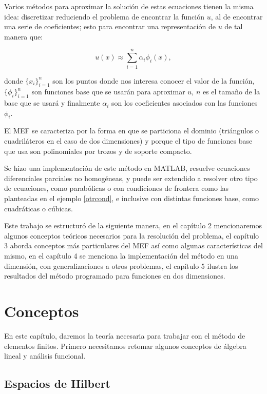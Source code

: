 \documentclass[12pt,spanish,oneside]{book}
\theoremstyle{plain}
\numberwithin{equation}{chapter}
\theoremstyle{definition}
\theoremstyle{remark}
\begin{document}
Varios métodos para aproximar la solución de estas ecuaciones tienen la misma idea: discretizar reduciendo el problema de encontrar la función $u$, al de encontrar una serie de coeficientes; esto para encontrar una representación de $u$ de tal manera que: 

\[u(x) \approx \sum_{i=1}^n\alpha_i \phi_i(x), \]

donde $\lbrace x_i\rbrace_{i=1}^n$ son los puntos donde nos interesa conocer el valor de la función, $\lbrace \phi_i \rbrace_{i=1}^n$ son funciones base que se usarán para aproximar $u$, $n$ es el tamaño de la base que se usará y finalmente $\alpha_i$ son los coeficientes asociados con las funciones $\phi_i$.

El MEF se caracteriza por la forma en que se particiona el dominio (triángulos o cuadriláteros en el caso de dos dimensiones) y porque el tipo de funciones base que usa son polinomiales por trozos y de soporte compacto.

Se hizo una implementación de este método en MATLAB, resuelve ecuaciones diferenciales parciales no homogéneas, y puede ser extendido a resolver otro tipo de ecuaciones, como parabólicas o con condiciones de frontera como las planteadas en el ejemplo \ref{otrcond}, e inclusive con distintas funciones base, como cuadráticas o cúbicas.

Este trabajo se estructuró de la siguiente manera, en el capítulo 2 mencionaremos algunos conceptos teóricos necesarios para la resolución del problema, el capítulo 3 aborda conceptos más particulares del MEF así como algunas características del mismo, en el capítulo 4 se menciona la implementación del método en una dimensión, con generalizaciones a otros problemas, el capítulo 5 ilustra los resultados del método programado para funciones en dos dimensiones.

 
\chapter{Conceptos} 

En este capítulo, daremos la teoría necesaria para trabajar con el método de elementos finitos. Primero necesitamos retomar algunos conceptos de álgebra lineal y análisis funcional.

\section{Espacios de Hilbert}
\end{document}
